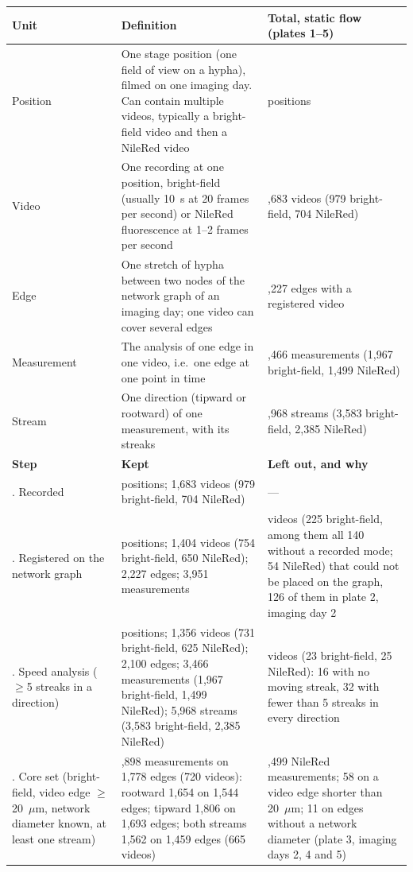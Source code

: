 \begin{table}[htbp]
\centering
{\footnotesize
\renewcommand{\arraystretch}{1.05}
\begin{tabularx}{\textwidth}{@{}>{\raggedright\arraybackslash}p{3.6cm}>{\raggedright\arraybackslash}X>{\raggedright\arraybackslash}p{6.0cm}@{}}
\toprule
\textbf{Unit} & \textbf{Definition} & \textbf{Total, static flow (plates 1--5)} \\
\midrule
Position & One stage position (one field of view on a hypha), filmed on one imaging day. Can contain multiple videos, typically a bright-field video and then a NileRed video & 804 positions \\
Video & One recording at one position, bright-field (usually 10~s at 20 frames per second) or NileRed fluorescence at 1--2 frames per second & 1,683 videos (979 bright-field, 704 NileRed) \\
Edge & One stretch of hypha between two nodes of the network graph of an imaging day; one video can cover several edges & 2,227 edges with a registered video \\
Measurement & The analysis of one edge in one video, i.e.\ one edge at one point in time & 3,466 measurements (1,967 bright-field, 1,499 NileRed) \\
Stream & One direction (tipward or rootward) of one measurement, with its streaks & 5,968 streams (3,583 bright-field, 2,385 NileRed) \\
\midrule[\heavyrulewidth]
\textbf{Step} & \textbf{Kept} & \textbf{Left out, and why} \\
\midrule
1. Recorded & 804 positions; 1,683 videos (979 bright-field, 704 NileRed) & --- \\
2. Registered on the network graph & 730 positions; 1,404 videos (754 bright-field, 650 NileRed); 2,227 edges; 3,951 measurements & 279 videos (225 bright-field, among them all 140 without a recorded mode; 54 NileRed) that could not be placed on the graph, 126 of them in plate 2, imaging day 2 \\
3. Speed analysis ($\geq$5 streaks in a direction) & 723 positions; 1,356 videos (731 bright-field, 625 NileRed); 2,100 edges; 3,466 measurements (1,967 bright-field, 1,499 NileRed); 5,968 streams (3,583 bright-field, 2,385 NileRed) & 48 videos (23 bright-field, 25 NileRed): 16 with no moving streak, 32 with fewer than 5 streaks in every direction \\
4. Core set (bright-field, video edge $\geq$20~$\mu$m, network diameter known, at least one stream) & 1,898 measurements on 1,778 edges (720 videos): rootward 1,654 on 1,544 edges; tipward 1,806 on 1,693 edges; both streams 1,562 on 1,459 edges (665 videos) & 1,499 NileRed measurements; 58 on a video edge shorter than 20~$\mu$m; 11 on edges without a network diameter (plate 3, imaging days 2, 4 and 5) \\

\end{tabularx}}
\end{table}
